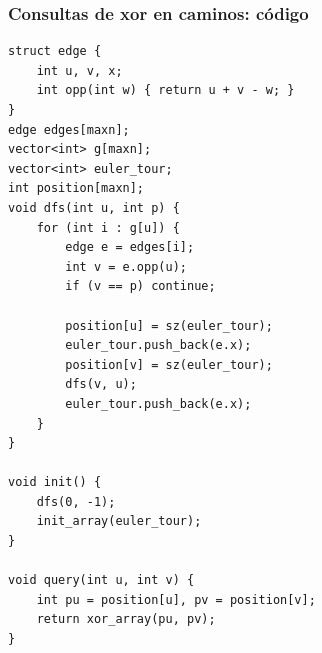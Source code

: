\begin{frame}[fragile]
  \frametitle{Consultas de xor en caminos: código}

\begin{lstlisting}
struct edge {
    int u, v, x;
    int opp(int w) { return u + v - w; }
}
edge edges[maxn];
vector<int> g[maxn];
vector<int> euler_tour;
int position[maxn];
void dfs(int u, int p) {
    for (int i : g[u]) {
        edge e = edges[i];
        int v = e.opp(u);
        if (v == p) continue;

        position[u] = sz(euler_tour);
        euler_tour.push_back(e.x);
        position[v] = sz(euler_tour);
        dfs(v, u);
        euler_tour.push_back(e.x);
    }
}

void init() {
    dfs(0, -1);
    init_array(euler_tour);
}

void query(int u, int v) {
    int pu = position[u], pv = position[v];
    return xor_array(pu, pv);
}
\end{lstlisting}
\end{frame}
